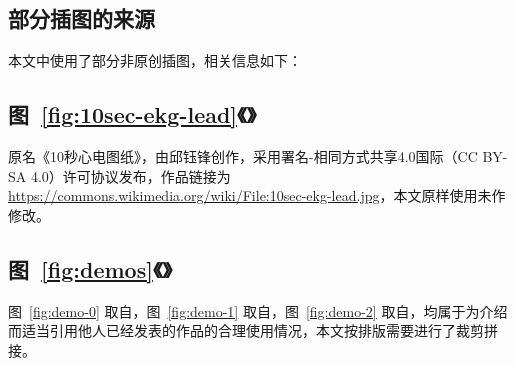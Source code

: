 

\begin{appendix}

    \begingroup
    \renewcommand{\clearpage}{\relax}
    \listoftodos
    \endgroup

    \listoffigures
    \listoffigureEng


    \chapter*{部分插图的来源}\label{ch:license}

    本文中使用了部分非原创插图，相关信息如下：

    \section*{图~\ref{fig:10sec-ekg-lead}《》}

    原名《10秒心电图纸》，由邱钰锋创作，采用署名-相同方式共享4.0国际（CC BY-SA 4.0）许可协议发布，作品链接为 \url{https://commons.wikimedia.org/wiki/File:10sec-ekg-lead.jpg}，本文原样使用未作修改。

    \section*{图~\ref{fig:demos}《》}

    图~\ref{fig:demo-0} 取自\cite{chenJiyushenduxuexidexindianfenximoxingdeshejiyuyouhua2021}，图~\ref{fig:demo-1} 取自\cite{liuJiyuyidongzhongduanfenxidekechuandairouxingxindianjiancexitong2021}，图~\ref{fig:demo-2} 取自\cite{jinPredictingCardiovascularDisease2009}，均属于为介绍而适当引用他人已经发表的作品的合理使用情况，本文按排版需要进行了裁剪拼接。

\end{appendix}
